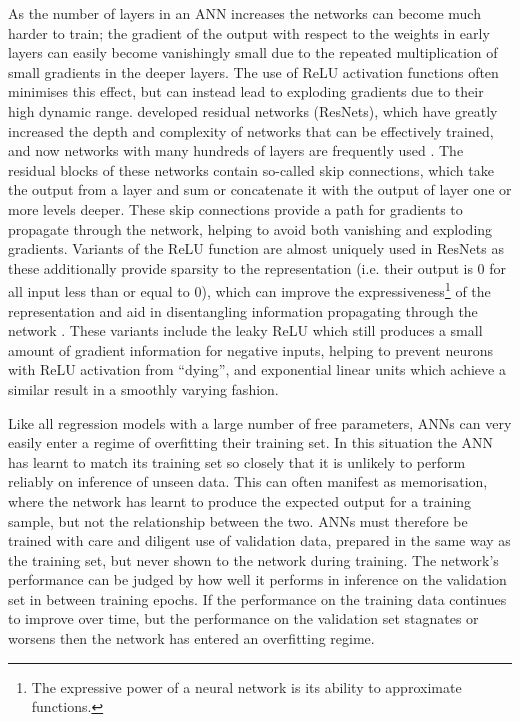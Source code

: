 As the number of layers in an ANN increases the networks can become much harder to train; the gradient of the output with respect to the weights in early layers can easily become vanishingly small due to the repeated multiplication of small gradients in the deeper layers.
The use of ReLU activation functions often minimises this effect, but can instead lead to exploding gradients due to their high dynamic range.
\citet{2015He} developed residual networks (ResNets), which have greatly increased the depth and complexity of networks that can be effectively trained, and now networks with many hundreds of layers are frequently used \citep[e.g.][]{Jegou2017}.
The residual blocks of these networks contain so-called skip connections, which take the output from a layer and sum or concatenate it with the output of layer one or more levels deeper.
These skip connections provide a path for gradients to propagate through the network, helping to avoid both vanishing and exploding gradients.
Variants of the ReLU function are almost uniquely used in ResNets as these additionally provide sparsity to the representation (i.e. their output is 0 for all input less than or equal to 0), which can improve the expressiveness\footnote{The expressive power of a neural network is its ability to approximate functions.} of the representation and aid in disentangling information propagating through the network \citep{Glorot2011}.
These variants include the leaky ReLU \citep[$\max(0.01x, x)$;][]{Maas2013} which still produces a small amount of gradient information for negative inputs, helping to prevent neurons with ReLU activation from ``dying'', and exponential linear units \citep[ELUs;][]{Clevert2015} which achieve a similar result in a smoothly varying fashion.

Like all regression models with a large number of free parameters, ANNs can very easily enter a regime of overfitting their training set.
In this situation the ANN has learnt to match its training set so closely that it is unlikely to perform reliably on inference of unseen data.
This can often manifest as memorisation, where the network has learnt to produce the expected output for a training sample, but not the relationship between the two.
ANNs must therefore be trained with care and diligent use of validation data, prepared in the same way as the training set, but never shown to the network during training.
The network's performance can be judged by how well it performs in inference on the validation set in between training epochs.
If the performance on the training data continues to improve over time, but the performance on the validation set stagnates or worsens then the network has entered an overfitting regime.

